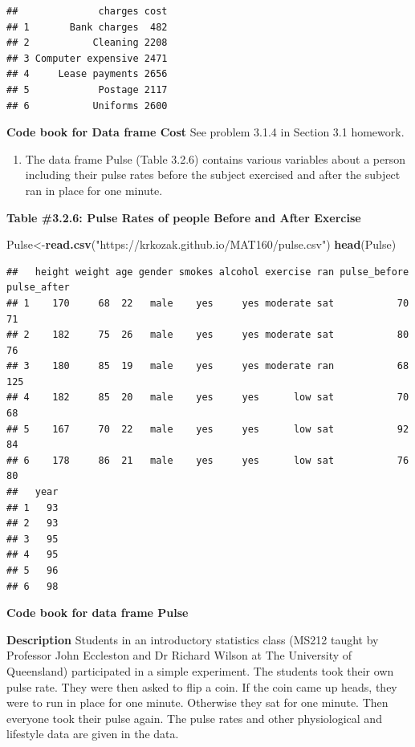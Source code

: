 \documentclass[
]{book}
\newenvironment{Shaded}{\begin{snugshade}}{\end{snugshade}}
\newcommand{\KeywordTok}[1]{\textcolor[rgb]{0.13,0.29,0.53}{\textbf{#1}}}
\newcommand{\NormalTok}[1]{#1}
\newcommand{\StringTok}[1]{\textcolor[rgb]{0.31,0.60,0.02}{#1}}
\providecommand{\tightlist}{%
  \setlength{\itemsep}{0pt}\setlength{\parskip}{0pt}}
\begin{document}
\begin{verbatim}
##              charges cost
## 1       Bank charges  482
## 2           Cleaning 2208
## 3 Computer expensive 2471
## 4     Lease payments 2656
## 5            Postage 2117
## 6           Uniforms 2600
\end{verbatim}

\textbf{Code book for Data frame Cost} See problem 3.1.4 in Section 3.1 homework.

\begin{enumerate}
\def\labelenumi{\arabic{enumi}.}
\setcounter{enumi}{4}
\tightlist
\item
  The data frame Pulse (Table 3.2.6) contains various variables about a person including their pulse rates before the subject exercised and after the subject ran in place for one minute.
\end{enumerate}

\textbf{Table \#3.2.6: Pulse Rates of people Before and After Exercise}

\begin{Shaded}
\begin{Highlighting}[]
\NormalTok{Pulse<-}\KeywordTok{read.csv}\NormalTok{(}\StringTok{"https://krkozak.github.io/MAT160/pulse.csv"}\NormalTok{)}
\KeywordTok{head}\NormalTok{(Pulse)}
\end{Highlighting}
\end{Shaded}

\begin{verbatim}
##   height weight age gender smokes alcohol exercise ran pulse_before pulse_after
## 1    170     68  22   male    yes     yes moderate sat           70          71
## 2    182     75  26   male    yes     yes moderate sat           80          76
## 3    180     85  19   male    yes     yes moderate ran           68         125
## 4    182     85  20   male    yes     yes      low sat           70          68
## 5    167     70  22   male    yes     yes      low sat           92          84
## 6    178     86  21   male    yes     yes      low sat           76          80
##   year
## 1   93
## 2   93
## 3   95
## 4   95
## 5   96
## 6   98
\end{verbatim}

\textbf{Code book for data frame Pulse}

\textbf{Description}
Students in an introductory statistics class (MS212 taught by Professor John Eccleston and Dr Richard Wilson at The University of Queensland) participated in a simple experiment. The students took their own pulse rate. They were then asked to flip a coin. If the coin came up heads, they were to run in place for one minute. Otherwise they sat for one minute. Then everyone took their pulse again. The pulse rates and other physiological and lifestyle data are given in the data.
\end{document}
